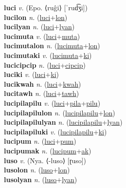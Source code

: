 \textbf{luci} \textit{v.} (Epo. ⟨ruĝi⟩ [ˈrud͡ʒi])
 \label{luci} \\
\textbf{lucilon} \textit{n.} (\hyperref[luci]{luci}+\hyperref[lon]{lon})
 \label{lucilon} \\
\textbf{lucilyan} \textit{n.} (\hyperref[luci]{luci}+\hyperref[lyan]{lyan})
 \label{lucilyan} \\
\textbf{lucimuta} \textit{v.} (\hyperref[luci]{luci}+\hyperref[muta]{muta})
 \label{lucimuta} \\
\textbf{lucimutalon} \textit{n.} (\hyperref[lucimuta]{lucimuta}+\hyperref[lon]{lon})
 \label{lucimutalon} \\
\textbf{lucimutaki} \textit{v.} (\hyperref[lucimuta]{lucimuta}+\hyperref[ki]{ki})
 \label{lucimutaki} \\
\textbf{lucicipcip} \textit{n.} (\hyperref[luci]{luci}+\hyperref[cipcip]{cipcip})
 \label{lucicipcip} \\
\textbf{luciki} \textit{v.} (\hyperref[luci]{luci}+\hyperref[ki]{ki})
 \label{luciki} \\
\textbf{lucikwah} \textit{n.} (\hyperref[luci]{luci}+\hyperref[kwah]{kwah})
 \label{lucikwah} \\
\textbf{lucitawh} \textit{n.} (\hyperref[luci]{luci}+\hyperref[tawh]{tawh})
 \label{lucitawh} \\
\textbf{lucipilapilu} \textit{v.} (\hyperref[luci]{luci}+\hyperref[pila]{pila}+\hyperref[pilu]{pilu})
 \label{lucipilapilu} \\
\textbf{lucipilapilulon} \textit{n.} (\hyperref[lucipilapilu]{lucipilapilu}+\hyperref[lon]{lon})
 \label{lucipilapilulon} \\
\textbf{lucipilapilulyan} \textit{n.} (\hyperref[lucipilapilu]{lucipilapilu}+\hyperref[lyan]{lyan})
 \label{lucipilapilulyan} \\
\textbf{lucipilapiluki} \textit{v.} (\hyperref[lucipilapilu]{lucipilapilu}+\hyperref[ki]{ki})
 \label{lucipilapiluki} \\
\textbf{lucipum} \textit{n.} (\hyperref[luci]{luci}+\hyperref[pum]{pum})
 \label{lucipum} \\
\textbf{lucipumak} \textit{n.} (\hyperref[lucipum]{lucipum}+\hyperref[ak]{ak})
 \label{lucipumak} \\
\textbf{luso} \textit{v.} (Nya. ⟨-luso⟩ [ɽuso])
 \label{luso} \\
\textbf{lusolon} \textit{n.} (\hyperref[luso]{luso}+\hyperref[lon]{lon})
 \label{lusolon} \\
\textbf{lusolyan} \textit{n.} (\hyperref[luso]{luso}+\hyperref[lyan]{lyan})
